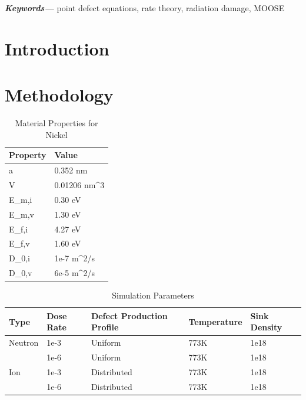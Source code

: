 \documentclass[a4paper]{article}
\providecommand{\keywords}[1]
{
  \small
  \textbf{\textit{Keywords---}} #1
}
\begin{document}
\keywords{point defect equations, rate theory, radiation damage, MOOSE}

% 


\section{Introduction} \hspace{10pt}

\section{Methodology} \hspace{10pt}

\begin{table}[h!]
  \centering
  \caption{Material Properties for Nickel\cite{walgraef1996}}
  \label{table:1}
  \begin{tabular}{ ||p{2cm}|p{2cm}||  }
     \hline
     Property & Value\\
     \hline\hline
     a  & 0.352 nm\\
     V  & 0.01206 nm^3\\
     E_{m,i}  & 0.30 eV\\
     E_{m,v}  & 1.30 eV\\
     E_{f,i}  & 4.27 eV\\
     E_{f,v}  & 1.60 eV\\
     D_{0,i}  & 1e-7 m^2/s\\
     D_{0,v}  & 6e-5 m^2/s\\

     \hline
  \end{tabular}
\end{table}

\begin{table}[h!]
  \centering
  \caption{Simulation Parameters}
  \label{table:2}
  \begin{tabular}{ ||p{2cm}|p{2cm}|p{4cm}|p{2cm}|p{2cm}||  }
     \hline
     Type & Dose Rate & Defect Production Profile & Temperature & Sink Density\\
     \hline
     \hline
     Neutron  & 1e-3  & Uniform     & 773K & 1e18\\
              & 1e-6  & Uniform     & 773K & 1e18\\
     \hline
     Ion      & 1e-3  & Distributed & 773K & 1e18\\
              & 1e-6  & Distributed & 773K & 1e18\\
     \hline
  \end{tabular}
\end{table}
\end{document}
